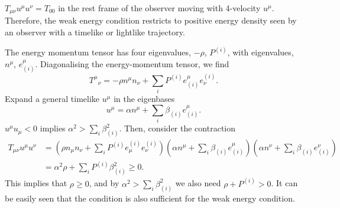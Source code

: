 \begin{solution}
    $T_{\mu\nu} u^\mu u^\nu = T_{00}$ in the rest frame of the observer moving with 4-velocity $u^\mu$. Therefore, the weak energy condition restricts to positive energy density seen by an observer with a timelike or lightlike trajectory.

    The energy momentum tensor has four eigenvalues, $-\rho$, $P^{(i)}$, with eigenvalues, $n^\mu$, $e_{(i)}^\mu$. Diagonalising the energy-momentum tensor, we find
    \begin{equation}
        T^\mu{}_\nu = -\rho n^\mu n_\nu + \sum_iP^{(i)}e^\mu_{(i)}e_\nu^{(i)}.
    \end{equation}
    Expand a general timelike $u^\mu$ in the eigenbases
    \begin{equation}
        u^\mu = \alpha n^\mu + \sum_i \beta_{(i)}e_{(i)}^\mu.
    \end{equation}
    $u^\mu u_\mu <0$ implies $\alpha^2  >\sum_i \beta_{(i)}^2$. Then, consider the contraction
    \begin{equation}
    \begin{aligned}
        T_{\mu\nu}u^\mu u^\nu &= \left(\rho n_\mu n_\nu + \sum_iP^{(i)}e_\mu^{(i)}e_\nu^{(i)}\right)\left(\alpha n^\mu + \sum_i \beta_{(i)}e_{(i)}^\mu\right)\left(\alpha n^\nu + \sum_i \beta_{(i)}e_{(i)}^\nu\right)\\
        &=\alpha^2\rho + \sum_iP^{(i)}\beta^2_{(i)}\geq 0.
    \end{aligned}
    \end{equation}
    This implies that $\rho \geq 0$, and by $\alpha^2  >\sum_i \beta_{(i)}^2$ we also need $\rho + P^{(i)} > 0$. It can be easily seen that the condition is also sufficient for the weak energy condition. 

    
\end{solution}